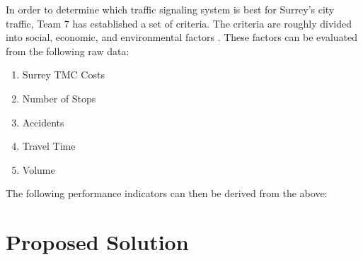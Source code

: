 In order to determine which traffic signaling system is best for Surrey’s city traffic, Team 7 has established a set of criteria. The criteria are roughly divided into social, economic, and environmental factors . These factors can be evaluated from the following raw data: 
\begin{enumerate}
\item Surrey TMC Costs
\item Number of Stops
\item Accidents
\item Travel Time
\item Volume
\end{enumerate}
The following performance indicators can then be derived from the above:

\begin{figure}[H]
\centering
{}
\end{figure}


\section{Proposed Solution}

